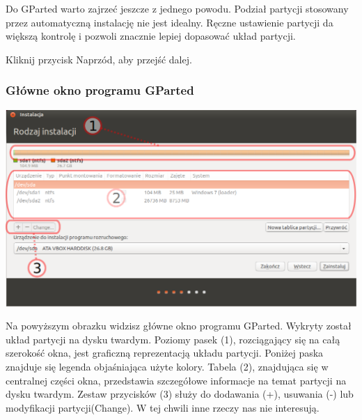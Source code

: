 Do GParted warto zajrzeć jeszcze z jednego powodu. Podział partycji stosowany przez automatyczną instalację nie jest idealny. Ręczne ustawienie partycji da większą kontrolę i pozwoli znacznie lepiej dopasować układ partycji.
\begin{flushright}
Kliknij przycisk \textcolor{ubuntu_orange}{Naprzód}, aby przejść dalej.
\end{flushright}
\clearpage
\subsubsection{Główne okno programu GParted}
\begin{center}
        \includegraphics[width=\linewidth]{images/instalator_partycjonowanie_gparted2.png}
\end{center}

Na powyższym obrazku widzisz główne okno programu GParted. Wykryty został układ partycji na dysku twardym. Poziomy pasek \textcolor{ubuntu_orange}{(}1\textcolor{ubuntu_orange}{)}, rozciągający się na całą szerokość okna, jest graficzną reprezentacją układu partycji. Poniżej paska znajduje się legenda objaśniająca użyte kolory. Tabela \textcolor{ubuntu_orange}{(}2\textcolor{ubuntu_orange}{)}, znajdująca się w centralnej części okna, przedstawia szczegółowe informacje na temat partycji na dysku twardym. Zestaw przycisków \textcolor{ubuntu_orange}{(}3\textcolor{ubuntu_orange}{)} służy do dodawania (\textcolor{ubuntu_orange}{+}), usuwania (\textcolor{ubuntu_orange}{-}) lub modyfikacji partycji(\textcolor{ubuntu_orange}{Change}). W tej chwili inne rzeczy nas nie interesują.

